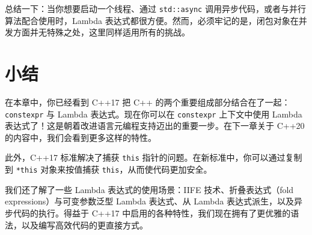 总结一下：当你想要启动一个线程、通过 \texttt{std::async} 调用异步代码，或者与并行算法配合使用时，Lambda 表达式都很方便。然而，必须牢记的是，闭包对象在并发方面并无特殊之处，这里同样适用所有的挑战。

\section{小结}

在本章中，你已经看到 C++17 把 C++ 的两个重要组成部分结合在了一起：\texttt{constexpr} 与 Lambda 表达式。现在你可以在 \texttt{constexpr} 上下文中使用 Lambda 表达式了！这是朝着改进语言元编程支持迈出的重要一步。在下一章关于 C++20 的内容中，我们会看到更多这样的特性。

此外，C++17 标准解决了捕获 \texttt{this} 指针的问题。在新标准中，你可以通过复制到 \texttt{*this} 对象来按值捕获 \texttt{this}，从而使代码更加安全。

我们还了解了一些 Lambda 表达式的使用场景：IIFE 技术、折叠表达式（fold expressions）与可变参数泛型 Lambda 表达式、从 Lambda 表达式派生，以及异步代码的执行。得益于 C++17 中启用的各种特性，我们现在拥有了更优雅的语法，以及编写高效代码的更直接方式。

